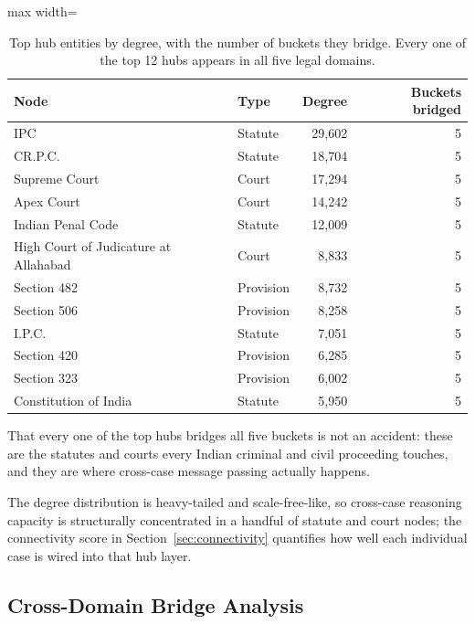 \begin{table}[H]
  \centering
  \small
  \begin{adjustbox}{max width=\textwidth}
  \begin{tabular}{llrr}
    \toprule
    Node & Type & Degree & Buckets bridged \\
    \midrule
    IPC & Statute & 29{,}602 & 5 \\
    CR.P.C. & Statute & 18{,}704 & 5 \\
    Supreme Court & Court & 17{,}294 & 5 \\
    Apex Court & Court & 14{,}242 & 5 \\
    Indian Penal Code & Statute & 12{,}009 & 5 \\
    High Court of Judicature at Allahabad & Court & 8{,}833 & 5 \\
    Section 482 & Provision & 8{,}732 & 5 \\
    Section 506 & Provision & 8{,}258 & 5 \\
    I.P.C. & Statute & 7{,}051 & 5 \\
    Section 420 & Provision & 6{,}285 & 5 \\
    Section 323 & Provision & 6{,}002 & 5 \\
    Constitution of India & Statute & 5{,}950 & 5 \\
    \bottomrule
  \end{tabular}
  \end{adjustbox}
  \caption{Top hub entities by degree, with the number of buckets they
  bridge. Every one of the top 12 hubs appears in all five legal
  domains.}
  \label{tab:top_hubs}
\end{table}

That every one of the top hubs bridges all five buckets is not an
accident: these are the statutes and courts every Indian criminal and
civil proceeding touches, and they are where cross-case message
passing actually happens.

The degree distribution is heavy-tailed and scale-free-like, so
cross-case reasoning capacity is structurally concentrated in a
handful of statute and court nodes; the connectivity score in
Section~\ref{sec:connectivity} quantifies how well each individual
case is wired into that hub layer.

\subsection{Cross-Domain Bridge Analysis}

